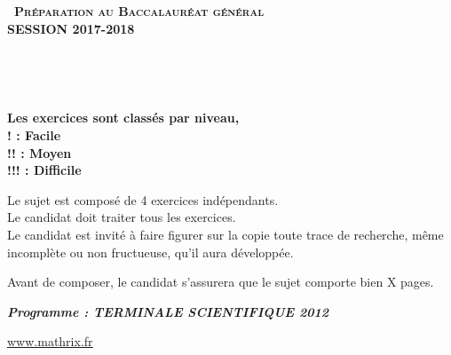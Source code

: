 \documentclass[11pt]{article}
\begin{document}
\setlength\parindent{0mm}

		\renewcommand \footrulewidth{.2pt}
		\pagestyle{fancy}
		\thispagestyle{empty} 

		\begin{center} 
		{\Large{\textbf{\textsc{\decofourleft~Préparation au Baccalauréat général ~\decofourright\\[5pt]
		\vspace{0.3cm}
		SESSION 2017-2018}}}}


		\vspace{1cm}

		\\

		\vspace{1.2cm}

		\\
		\vspace{0.4cm}

		\vspace{0.4cm}
		\textbf{Les exercices sont classés par niveau, \\ 
		! : Facile\\
		!! : Moyen\\
		!!! : Difficile }
		\vspace{1.5cm}

		Le sujet est composé de 4 exercices indépendants.\\
		Le candidat doit traiter tous les exercices.\\
		Le candidat est invité à faire figurer sur la copie toute trace de recherche, même incomplète ou 			non fructueuse, qu'il aura développée.

		\vspace{1.5cm}

		Avant de composer, le candidat s'assurera que le sujet comporte bien X pages.

		\vspace{1cm}

		\textbf{\textit{Programme : TERMINALE SCIENTIFIQUE 2012}}
	
		\vspace{2cm}
		\href{http://www.mathrix.fr}{\Large\underline{www.mathrix.fr}}


\newpage
	\end{center}
\end{document}
